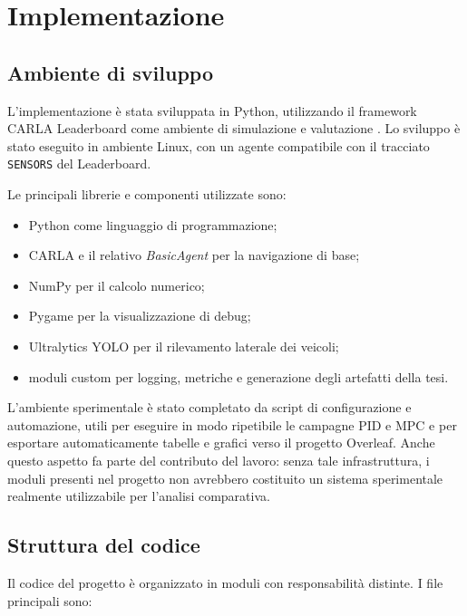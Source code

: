 \chapter{Implementazione}

\section{Ambiente di sviluppo}

L'implementazione è stata sviluppata in Python, utilizzando il framework CARLA Leaderboard come ambiente di simulazione e valutazione \cite{dosovitskiy2017carla}. Lo sviluppo è stato eseguito in ambiente Linux, con un agente compatibile con il tracciato \texttt{SENSORS} del Leaderboard.

Le principali librerie e componenti utilizzate sono:

\begin{itemize}
    \item Python come linguaggio di programmazione;
    \item CARLA e il relativo \textit{BasicAgent} per la navigazione di base;
    \item NumPy per il calcolo numerico;
    \item Pygame per la visualizzazione di debug;
    \item Ultralytics YOLO per il rilevamento laterale dei veicoli;
    \item moduli custom per logging, metriche e generazione degli artefatti della tesi.
\end{itemize}

L'ambiente sperimentale è stato completato da script di configurazione e automazione, utili per eseguire in modo ripetibile le campagne PID e MPC e per esportare automaticamente tabelle e grafici verso il progetto Overleaf. Anche questo aspetto fa parte del contributo del lavoro: senza tale infrastruttura, i moduli presenti nel progetto non avrebbero costituito un sistema sperimentale realmente utilizzabile per l'analisi comparativa.

\section{Struttura del codice}

Il codice del progetto è organizzato in moduli con responsabilità distinte. I file principali sono:

